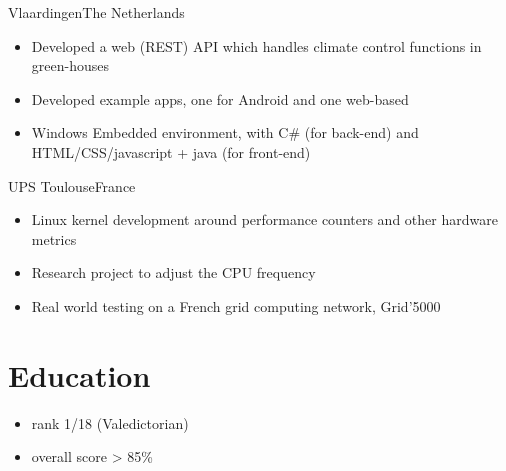 \documentclass[a4paper,11pt,sans]{moderncv}
\begin{document}
{Vlaardingen}{The Netherlands}
{
  \begin{itemize}
  \item Developed a web (REST) API which handles climate control functions in green-houses
  \item Developed example apps, one for Android and one web-based
  \item Windows Embedded environment, with C\# (for back-end) and HTML/CSS/javascript + java (for front-end)
  \end{itemize}
}

{UPS Toulouse}{France}
{
  \begin{itemize}
    \item Linux kernel development around performance counters and other hardware metrics
    \item Research project to adjust the CPU frequency
    \item Real world testing on a French grid computing network, Grid'5000
  \end{itemize}
}


\section{Education}
{
  \begin{itemize}
  \item rank 1/18 (Valedictorian)
  \item overall score > 85\%
  \end{itemize}
}
\end{document}
